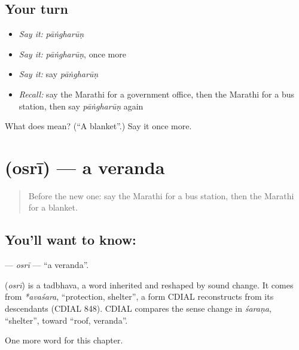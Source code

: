 \subsection*{Your turn}
\begin{itemize}
\raggedright
  \item \emph{Say it:} \emph{pāṅgharūṇ}
  \item \emph{Say it:} \emph{pāṅgharūṇ}, once more
  \item \emph{Say it:} say \emph{pāṅgharūṇ}
  \item \emph{Recall:} say the Marathi for a government office, then the Marathi for a bus station, then say \emph{pāṅgharūṇ} again
\end{itemize}

\begin{tcolorbox}[breakable,colback=teal!4,colframe=teal!35!black,title={Before you move on}]
What does  mean? (\textquotedblleft{}A blanket\textquotedblright{}.) Say it once more.
\end{tcolorbox}
\section[\texorpdfstring{\mr{ओसरी} (osrī)}{ओसरी (osrī)}]{ (osrī) — a veranda}

\label{lesson:MR-C271-osri}



\begin{quote}
Before the new one: say the Marathi for a bus station, then the Marathi for a blanket.
\end{quote}

\subsection*{You'll want to know: }
\textbf{} — \emph{osrī} — \textquotedblleft{}a veranda\textquotedblright{}.

\begin{cousinweb}
\textbf{} (\emph{osrī}) is a tadbhava, a word inherited and reshaped by sound change. It comes from \emph{*avaśara}, \textquotedblleft{}protection, shelter\textquotedblright{}, a form CDIAL reconstructs from its descendants (CDIAL 848). CDIAL compares the sense change in \emph{śaraṇa}, \textquotedblleft{}shelter\textquotedblright{}, toward \textquotedblleft{}roof, veranda\textquotedblright{}.
\end{cousinweb}

\begin{grammarlens}[title={What you've built}]
One more word for this chapter.
\end{grammarlens}


